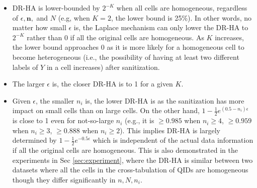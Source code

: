\documentclass[10pt,journal,compsoc]{IEEEtran}
\newcommand{\n}{\mathbf{n}}
\begin{document}
\begin{itemize}[leftmargin=12pt]\setlength\itemsep{-3pt} 
\item DR-HA is lower-bounded by $2^{-K}$ when all cells are homogeneous, regardless of $\epsilon,\n,$ and $N$ (e.g, when $K=2$, the lower bound is 25\%). In other words, no matter how small $\epsilon$ is, the Laplace mechanism can only lower the DR-HA  to $2^{-K}$ rather than 0 if all the original cells are homogeneous.  As $K$ increases, the lower bound approaches $0$ as it is more likely for a homogeneous cell  to become heterogeneous (i.e., the possibility of having at least two different labels of $Y$ in a cell increases) after sanitization.   
\item The larger $\epsilon$ is, the closer DR-HA is to 1 for a given $K$.
\item Given $\epsilon$, the smaller $n_i$ is, the lower DR-HA is as the sanitization has more impact on small cells than on large cells.  On the other hand,  $1-\frac{1}{2}e^{(0.5-n_i)\epsilon}$ is close to 1 even for not-so-large $n_i$ (e.g., it is $\ge0.985$ when $n_i\ge4$, $\ge0.959$ when $n_i\ge3$, $\ge0.888$ when $n_i\ge2$). This implies DR-HA is largely determined by $1-\frac{1}{2}e^{-0.5\epsilon}$ which is independent of the actual data information if all the original cells are homogeneous. This is also demonstrated in the experiments in Sec \ref{sec:experiment}, where the DR-HA is similar between two datasets where all the cells in the cross-tabulation of QIDs are homogeneous though they differ significantly in $n, N, n_i$.
\end{itemize}



\vspace{-9pt}
\end{document}
